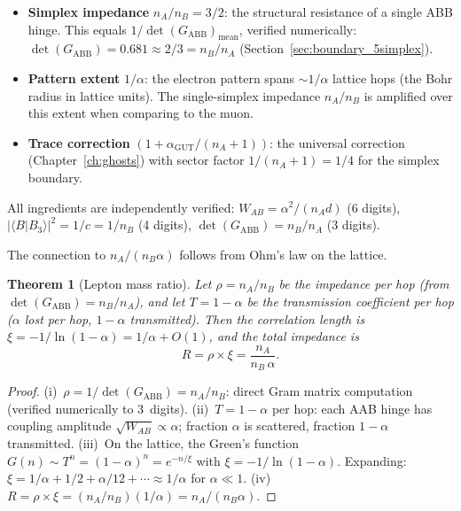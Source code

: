 \documentclass[12pt]{article}
\newtheorem{theorem}{Theorem}[section]
\theoremstyle{remark}
\theoremstyle{definition}
\begin{document}
\begin{itemize}
\item \textbf{Simplex impedance} $n_A/n_B = 3/2$: the structural resistance of a single ABB hinge.  This equals $1/\det(G_\mathrm{ABB})_\mathrm{mean}$, verified numerically: $\det(G_\mathrm{ABB}) = 0.681 \approx 2/3 = n_B/n_A$ (Section~\ref{sec:boundary_5simplex}).

\item \textbf{Pattern extent} $1/\alpha$: the electron pattern spans $\sim 1/\alpha$ lattice hops (the Bohr radius in lattice units).  The single-simplex impedance $n_A/n_B$ is amplified over this extent when comparing to the muon.

\item \textbf{Trace correction} $(1 + \alpha_\mathrm{GUT}/(n_A+1))$: the universal correction (Chapter~\ref{ch:ghosts}) with sector factor $1/(n_A+1) = 1/4$ for the simplex boundary.
\end{itemize}

All ingredients are independently verified: $W_{AB} = \alpha^2/(n_A d)$ (6 digits), $|\langle B|B_3\rangle|^2 = 1/c = 1/n_B$ (4 digits), $\det(G_\mathrm{ABB}) = n_B/n_A$ (3 digits).

The connection to $n_A/(n_B\alpha)$ follows from Ohm's law on the lattice.

\begin{theorem}[Lepton mass ratio]
\label{thm:lepton_mass}
Let $\rho = n_A/n_B$ be the impedance per hop (from $\det(G_\mathrm{ABB}) = n_B/n_A$), and let $T = 1 - \alpha$ be the transmission coefficient per hop ($\alpha$ lost per hop, $1-\alpha$ transmitted).  Then the correlation length is $\xi = -1/\ln(1-\alpha) = 1/\alpha + O(1)$, and the total impedance is
\begin{equation}
R = \rho \times \xi = \frac{n_A}{n_B\,\alpha}.
\end{equation}
\end{theorem}

\begin{proof}
(i)~$\rho = 1/\det(G_\mathrm{ABB}) = n_A/n_B$: direct Gram matrix computation (verified numerically to 3~digits). (ii)~$T = 1 - \alpha$ per hop: each AAB hinge has coupling amplitude $\sqrt{W_{AB}} \propto \alpha$; fraction $\alpha$ is scattered, fraction $1-\alpha$ transmitted. (iii)~On the lattice, the Green's function $G(n) \sim T^n = (1-\alpha)^n = e^{-n/\xi}$ with $\xi = -1/\ln(1-\alpha)$.  Expanding: $\xi = 1/\alpha + 1/2 + \alpha/12 + \cdots \approx 1/\alpha$ for $\alpha \ll 1$. (iv)~$R = \rho \times \xi = (n_A/n_B)(1/\alpha) = n_A/(n_B\alpha)$.
\end{proof}
\end{document}

